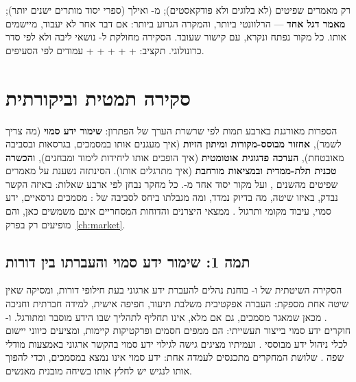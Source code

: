 \begin{pcguide}
רק מאמרים שפיטים (לא בלוגים ולא פודקאסטים); מ- ואילך (ספרי יסוד מותרים ישנים יותר);
\textbf{מאמר דגל אחד} --- הרלוונטי ביותר, והמקרה הגרוע ביותר: אם דבר אחר לא יעבוד, מיישמים אותו.
כל מקור נפתח ונקרא, עם קישור שעובד. הסקירה מחולקת ל- נושאי ליבה ולא לפי סדר כרונולוגי.
תקציב:  +  +  +  +  +  עמודים לפי הסעיפים.
\end{pcguide}

\section{סקירה תמטית וביקורתית}\label{sec:review}
הספרות מאורגנת בארבע תמות לפי שרשרת הערך של הפתרון: \textbf{שימור ידע סמוי} (מה צריך לשמר), \textbf{אחזור מבוסס-מקורות
ומיתון הזיות} (איך מעגנים אותו במסמכים, בגרסאות ובסביבה מאובטחת), \textbf{הערכה פדגוגית אוטומטית} (איך הופכים אותו
ליחידות לימוד ומבחנים), ו\textbf{הכשרה טכנית \mbox{תלת-ממדית} ובמציאות מורחבת} (איך מתרגלים אותו). הסינתזה נשענת על
 מאמרים שפיטים מהשנים , ועל מקור יסוד אחד מ-. כל מחקר נבחן לפי ארבע שאלות: באיזה הקשר
נבדק, באיזו שיטה, מה בדיוק נמדד, ומה מגבלתו ביחס לסביבה של : מסמכים גרסאיים, ידע סמוי, עיבוד מקומי ותרגול
. ממצאי היצרנים והדוחות המסחריים אינם משמשים כאן, והם מופיעים רק בפרק~\ref{ch:market}.

\subsection{תמה 1: שימור ידע סמוי והעברתו בין דורות}
הסקירה השיטתית של  ו- בוחנת נהלים להעברת ידע ארגוני בעת חילופי דורות, ומסיקה שאין שיטה אחת
מספקת: העברה אפקטיבית משלבת תיעוד, חפיפה אישית, למידה חברתית וחניכה \cite{igoa2024transfer}. מכאן שמאגר מסמכים, גם אם מלא,
אינו תחליף לתהליך שבו הידע מוסבר ומתורגל.  ו- חוקרים ידע סמוי בייצור תעשייתי: הם ממפים חסמים
ופרקטיקות קיימות, ומציעים כיווני יישום לכלי ניהול ידע מבוססי  \cite{finkel2026unlocking}.  ועמיתיו
מציגים גישה לגילוי ידע סמוי בהקשר ארגוני באמצעות מודלי שפה \cite{zuin2025tacit}. שלושת המחקרים מתכנסים לעמדה אחת:
ידע סמוי אינו נמצא במסמכים, וכדי להפוך אותו לנגיש יש לחלץ אותו בשיחה מובנית מאנשים.

